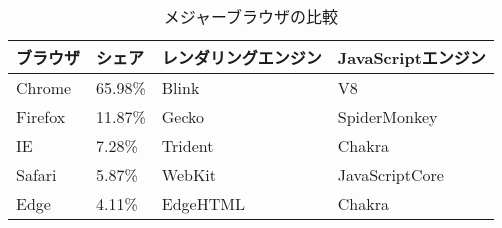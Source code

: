 \begin{table}[H]
\centering
\caption{メジャーブラウザの比較}
\label{tb-browser_family}
\begin{tabular}{llll}
ブラウザ    & シェア     & レンダリングエンジン & JavaScriptエンジン \\ \hline\hline
Chrome  & 65.98\% & Blink      & V8             \\\hline
Firefox & 11.87\% & Gecko      & SpiderMonkey   \\\hline
IE      & 7.28\%  & Trident    & Chakra         \\\hline
Safari  & 5.87\%  & WebKit     & JavaScriptCore \\\hline
Edge    & 4.11\%  & EdgeHTML   & Chakra        
\end{tabular}
\end{table}